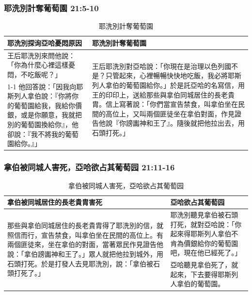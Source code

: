 \subsubsection{耶洗別計奪葡萄園 21:5-10}
\begin{table}[H]
\centering 
{}
\begin{tabular}{p{7.25cm}|p{}}\hline\hline
耶洗別探询亞哈憂悶原因&耶洗別計奪葡萄園\\\hline
王后耶洗別來問他說：「你為什麼心裡這樣憂悶，不吃飯呢？」&\multirow{2}{10.2cm}{王后耶洗別對亞哈說：「你現在是治理以色列國不是？只管起來，心裡暢暢快快地吃飯，我必將耶斯列人拿伯的葡萄園給你。」於是託亞哈的名寫信，用王的印印上，送給那些與拿伯同城居住的長老貴胄。信上寫著說：「你們當宣告禁食，叫拿伯坐在民間的高位上，又叫兩個匪徒坐在拿伯對面，作見證告他說『你謗讟神和王了』。隨後就把他拉出去，用石頭打死。」}\\\cline{1-1}
他回答說：「因我向耶斯列人拿伯說：『你將你的葡萄園給我，我給你價銀，或是你願意，我就把別的葡萄園換給你』，他卻說：『我不將我的葡萄園給你。』」&\\\hline
\end{tabular}
\caption{耶洗別計奪葡萄園}
\end{table} 


\subsubsection{拿伯被同城人害死，亞哈欲占其葡萄园 21:11-16}
\begin{table}[H]
\centering 
{}
\begin{tabular}{p{8.75cm}|p{8.25cm}}\hline\hline
拿伯被同城居住的長老貴胄害死&亞哈欲占其葡萄园\\\hline
\multirow{2}{8.9cm}{那些與拿伯同城居住的長老貴胄得了耶洗別的信，就照信而行，宣告禁食，叫拿伯坐在民間的高位上。有兩個匪徒來，坐在拿伯的對面，當著眾民作見證告他說：「拿伯謗讟神和王了。」眾人就把他拉到城外，用石頭打死。於是打發人去見耶洗別，說：「拿伯被石頭打死了。」}&耶洗別聽見拿伯被石頭打死，就對亞哈說：「你起來得耶斯列人拿伯不肯為價銀給你的葡萄園吧，現在他已經死了。」 \\\cline{2-2}
&亞哈聽見拿伯死了，就起來，下去要得耶斯列人拿伯的葡萄園。\\\hline
\end{tabular}
\caption{拿伯被同城人害死，亞哈欲占其葡萄园}
\end{table} 



